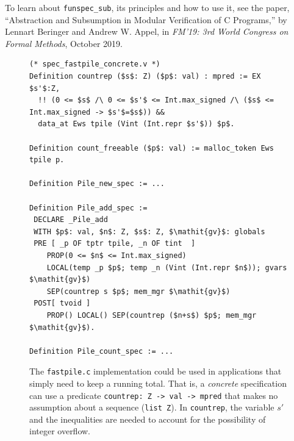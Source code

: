 \documentclass[runningheads,orivec]{llncs}
\begin{document}
To learn about \lstinline{funspec_sub}, its principles and how
to use it, see the paper, ``Abstraction and Subsumption in
Modular Verification of C Programs,''
by Lennart Beringer and Andrew W. Appel,
in \emph{FM'19: 3rd World Congress on Formal Methods},
October 2019.

\begin{figure}[t]
\begin{lstlisting}[language=coq]
(* spec_fastpile_concrete.v *)
Definition countrep ($s$: Z) ($p$: val) : mpred := EX $s'$:Z, 
  !! (0 <= $s$ /\ 0 <= $s'$ <= Int.max_signed /\ ($s$ <= Int.max_signed -> $s'$=$s$)) &&
  data_at Ews tpile (Vint (Int.repr $s'$)) $p$.

Definition count_freeable ($p$: val) := malloc_token Ews tpile p.

Definition Pile_new_spec := ...

Definition Pile_add_spec :=
 DECLARE _Pile_add
 WITH $p$: val, $n$: Z, $s$: Z, $\mathit{gv}$: globals
 PRE [ _p OF tptr tpile, _n OF tint  ]
    PROP(0 <= $n$ <= Int.max_signed)
    LOCAL(temp _p $p$; temp _n (Vint (Int.repr $n$)); gvars $\mathit{gv}$)
    SEP(countrep s $p$; mem_mgr $\mathit{gv}$)
 POST[ tvoid ]
    PROP() LOCAL() SEP(countrep ($n+s$) $p$; mem_mgr $\mathit{gv}$).

Definition Pile_count_spec := ...
\end{lstlisting}
\caption{\label{fastpile-concrete}The \lstinline{fastpile.c} implementation could be used
  in applications that simply need to keep a running total.
  That is, a \emph{concrete} specification can use
  a predicate \lstinline{countrep: Z -> val -> mpred}
  that makes no assumption about a sequence (\lstinline{list Z}).
  In \lstinline{countrep}, the variable $s'$ and the
    inequalities are needed to account for the possibility
    of integer overflow.
}
\end{figure}
\end{document}
